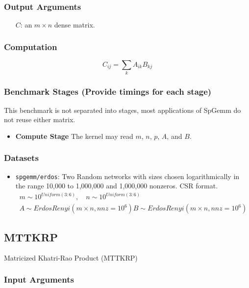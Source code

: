 \documentclass{article}
\begin{document}
\subsubsection{Output Arguments}

\begin{itemize}
	\item[$C$:] an $m \times n$ dense matrix.
\end{itemize}

\subsubsection{Computation}

$$C_{ij} = \sum_{k}A_{ik}B_{kj}$$

\subsubsection{Benchmark Stages (Provide timings for each stage)}

This benchmark is not separated into stages, most applications of SpGemm do not
reuse either matrix.

\begin{itemize}
\item \textbf{Compute Stage}
	The kernel may read $m$, $n$, $p$, $A$, and $B$.
\end{itemize}

\subsubsection{Datasets}

\begin{itemize}
	\item \texttt{spgemm/erdos}: Two Random networks with sizes chosen logarithmically in the range 10,000 to 1,000,000 and 1,000,000 nonzeros. CSR format.
	\begin{multline*}
		m \sim 10^{Uniform(3:6)}, \quad n \sim 10^{Uniform(3:6)} \\
			A \sim ErdosRenyi\left(m\times n, nnz=10^6\right)
			B \sim ErdosRenyi\left(m\times n, nnz=10^6\right)
	\end{multline*}
\end{itemize}

\subsection{MTTKRP}
Matricized Khatri-Rao Product (MTTKRP)
\subsubsection{Input Arguments}
\end{document}
